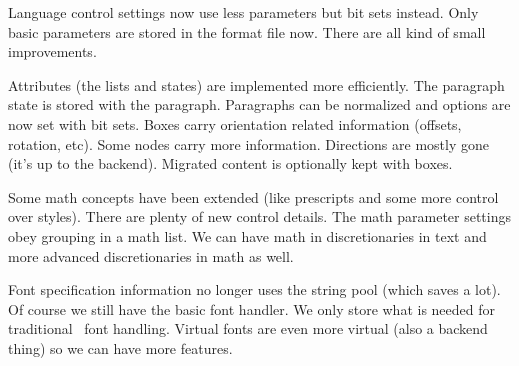\stopitemize

\stoptitle

\starttitle[title=Language]

\startitemize

\startitem
    Language control settings now use less parameters but bit sets instead.
\stopitem
\startitem
    Only basic parameters are stored in the format file now.
\stopitem
\startitem
    There are all kind of small improvements.
\stopitem

\stopitemize

\stoptitle

\starttitle[title=Typesetting]

\startitemize

\startitem
    Attributes (the lists and states) are implemented more efficiently.
\stopitem
\startitem
    The paragraph state is stored with the paragraph.
\stopitem
\startitem
    Paragraphs can be normalized and options are now set with bit sets.
\stopitem
\startitem
    Boxes carry orientation related information (offsets, rotation, etc).
\stopitem
\startitem
    Some nodes carry more information.
\stopitem
\startitem
    Directions are mostly gone (it's up to the backend).
\stopitem
\startitem
    Migrated content is optionally kept with boxes.
\stopitem

\stopitemize

\stoptitle

\starttitle[title=Math]

\startitemize

\startitem
    Some math concepts have been extended (like prescripts and some more
    control over styles).
\stopitem
\startitem
    There are plenty of new control details.
\stopitem
\startitem
    The math parameter settings obey grouping in a math list.
\stopitem
\startitem
    We can have math in discretionaries in text and more advanced discretionaries
    in math as well.
\stopitem

\stopitemize

\stoptitle

\starttitle[title=Fonts]

\startitemize

\startitem
    Font specification information no longer uses the string pool (which saves a
    lot).
\stopitem
\startitem
    Of course we still have the basic font handler.
\stopitem
\startitem
    We only store what is needed for traditional \TEX\ font handling.
\stopitem
\startitem
    Virtual fonts are even more virtual (also a backend thing) so we can have
    more features.
\stopitem

